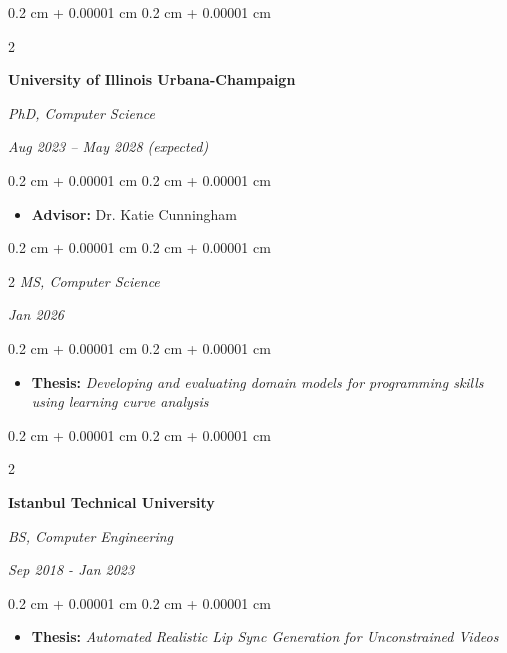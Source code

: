 \documentclass[10pt, letterpaper]{article}
\newenvironment{highlights}{
    \begin{itemize}[
        topsep=0.10 cm,
        parsep=0.10 cm,
        partopsep=0pt,
        itemsep=0pt,
        leftmargin=0.4 cm + 10pt
    ]
}{
    \end{itemize}
} %
\newenvironment{onecolentry}{
    \begin{adjustwidth}{
        0.2 cm + 0.00001 cm
    }{
        0.2 cm + 0.00001 cm
    }
}{
    \end{adjustwidth}
} %
\newenvironment{twocolentry}[2][]{
    \onecolentry
    \def\secondColumn{#2}
    \setcolumnwidth{\fill, 4.5 cm}
    \begin{paracol}{2}
}{
    \switchcolumn \raggedleft \secondColumn
    \end{paracol}
    \endonecolentry
} %
\begin{document}
        
        \begin{twocolentry}{
            
            
        \textit{Aug 2023 – May 2028 (expected)}}
            \textbf{University of Illinois Urbana-Champaign}

            \textit{PhD, Computer Science}

        \end{twocolentry}
        \vspace{0.10 cm}
        \begin{onecolentry}
            \begin{highlights}
                \item \textbf{Advisor:} Dr. Katie Cunningham
            \end{highlights}
        \end{onecolentry}
            \begin{twocolentry}
            {\textit{Jan 2026}}{\textit{MS, Computer Science}}
            \end{twocolentry}
            
        \vspace{0.10 cm}
        \begin{onecolentry}
            \begin{highlights}
                \item \textbf{Thesis:} \textit{Developing and evaluating domain models for programming skills using learning curve analysis}
            \end{highlights}
        \end{onecolentry}


        \vspace{0.20cm}
        \begin{twocolentry}{
            \textit{Sep 2018 - Jan 2023}}
        
            \textbf{Istanbul Technical University}
            
            \textit{BS, Computer Engineering}
        \end{twocolentry}

        \vspace{0.10 cm}
        \begin{onecolentry}
            \begin{highlights}
                \item \textbf{Thesis:} \textit{Automated Realistic Lip Sync Generation for Unconstrained Videos}
            \end{highlights}
        \end{onecolentry}
\end{document}
